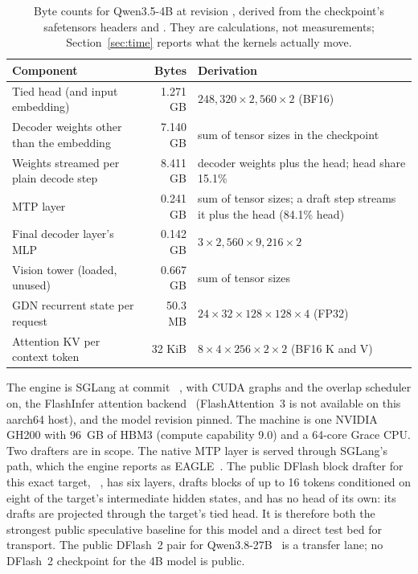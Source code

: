\begin{table}[tbp]
\small\centering
\begin{tabularx}{\linewidth}{@{}P{5.2cm}rY@{}}\toprule
Component & Bytes & Derivation\\\midrule
Tied head (and input embedding) & 1.271 GB & $248{,}320\times2{,}560\times2$ (BF16)\\
Decoder weights other than the embedding & 7.140 GB & sum of tensor sizes in the checkpoint\\
Weights streamed per plain decode step & 8.411 GB & decoder weights plus the head; head share 15.1\%\\
MTP layer & 0.241 GB & sum of tensor sizes; a draft step streams it plus the head (84.1\% head)\\
Final decoder layer's MLP & 0.142 GB & $3\times2{,}560\times9{,}216\times2$\\
Vision tower (loaded, unused) & 0.667 GB & sum of tensor sizes\\
GDN recurrent state per request & 50.3 MB & $24\times32\times128\times128\times4$ (FP32)\\
Attention KV per context token & 32 KiB & $8\times4\times256\times2\times2$ (BF16 K and V)\\\bottomrule
\end{tabularx}
\caption{Byte counts for Qwen3.5-4B at revision \modelpin, derived from the checkpoint's safetensors headers and . They are calculations, not measurements; Section~\ref{sec:time} reports what the kernels actually move.}
\label{tab:bytes}
\end{table}

The engine is SGLang at commit \sourcepin~\cite{sglangpaper}, with CUDA graphs and the overlap scheduler on, the FlashInfer attention backend~\cite{flashinfer} (FlashAttention~3 is not available on this aarch64 host), and the model revision pinned. The machine is one NVIDIA GH200 with 96~GB of HBM3 (compute capability 9.0) and a 64-core Grace CPU. Two drafters are in scope. The native MTP layer is served through SGLang's  path, which the engine reports as EAGLE~\cite{eagle}. The public DFlash block drafter for this exact target, ~\cite{dflashpaper,dflash4bcard}, has six layers, drafts blocks of up to 16 tokens conditioned on eight of the target's intermediate hidden states, and has no head of its own: its drafts are projected through the target's tied head. It is therefore both the strongest public speculative baseline for this model and a direct test bed for transport. The public DFlash~2 pair for Qwen3.8-27B~\cite{dflash,dflashcard} is a transfer lane; no DFlash~2 checkpoint for the 4B model is public.

